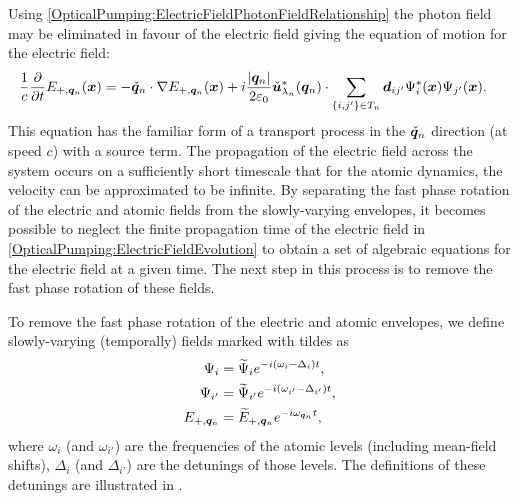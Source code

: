 Using \eqref{OpticalPumping:ElectricFieldPhotonFieldRelationship} the photon field may be eliminated in favour of the electric field giving the equation of motion for the electric field:
\begin{align}
    \frac{1}{c} \frac{\partial}{\partial t} E_{+, \vect{q}_n} (\vect{x}) &= - \unitvec{q}_n \cdot \nabla E_{+, \vect{q}_n}(\vect{x}) + i \frac{\abs{\vect{q}_n}}{2 \varepsilon_0} \unitvec{u}^*_{\lambda_n}(\vect{q}_n) \cdot \sum_{\{i,j'\}\in T_n} \vect{d}_{ij'} \Psi^*_i(\vect{x}) \Psi_{j'}(\vect{x}). \label{OpticalPumping:ElectricFieldEvolution}
\end{align}
This equation has the familiar form of a transport process in the $\check{\bm{q}}_n$ direction (at speed $c$) with a source term. The propagation of the electric field across the system occurs on a sufficiently short timescale that for the atomic dynamics, the velocity can be approximated to be infinite.  By separating the fast phase rotation of the electric and atomic fields from the slowly-varying envelopes, it becomes possible to neglect the finite propagation time of the electric field in \eqref{OpticalPumping:ElectricFieldEvolution} to obtain a set of algebraic equations for the electric field at a given time.  The next step in this process is to remove the fast phase rotation of these fields.

To remove the fast phase rotation of the electric and atomic envelopes, we define slowly-varying (temporally) fields marked with tildes as
\begin{subequations}
    \label{OpticalPumping:PhaseRotationDefinition}
    \begin{align}
        \Psi_i &= \widetilde{\Psi}_i e^{-i (\omega_i - \Delta_i)t}, \\
        \Psi_{i'} &= \widetilde{\Psi}_{i'} e^{-i (\omega_{i'} - \Delta_{i'}) t}, \\
        E_{+, \vect{q}_n} &= \widetilde{E}_{+, \vect{q}_n} e^{-i \omega_{\vect{q}_n}t},
    \end{align}
\end{subequations}
where $\omega_i$ (and $\omega_{i'}$) are the frequencies of the atomic levels (including mean-field shifts), $\Delta_i$ (and $\Delta_{i'}$) are the detunings of those levels.  The definitions of these detunings are illustrated in .

